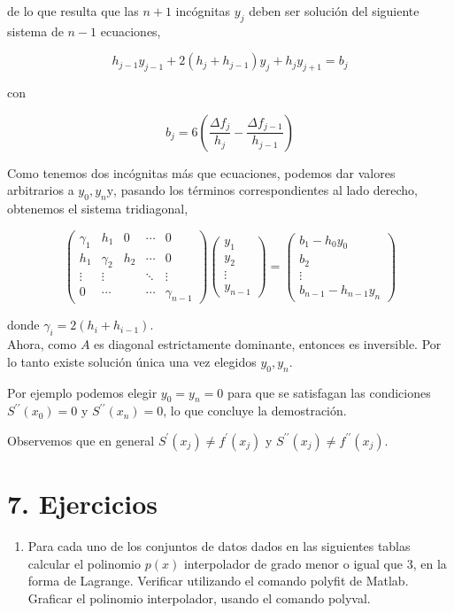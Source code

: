 \documentclass[10pt]{article}
\begin{document}
de lo que resulta que las $n+1$ incógnitas $y_{j}$ deben ser solución del siguiente sistema de $n-1$ ecuaciones,

$$
h_{j-1} y_{j-1}+2\left(h_{j}+h_{j-1}\right) y_{j}+h_{j} y_{j+1}=b_{j}
$$

con

$$
b_{j}=6\left(\frac{\Delta f_{j}}{h_{j}}-\frac{\Delta f_{j-1}}{h_{j-1}}\right)
$$

Como tenemos dos incógnitas más que ecuaciones, podemos dar valores arbitrarios a $y_{0}, y_{n} \mathrm{y}$, pasando los términos correspondientes al lado derecho, obtenemos el sistema tridiagonal,

$$
\left(\begin{array}{ccccc}
\gamma_{1} & h_{1} & 0 & \cdots & 0 \\
h_{1} & \gamma_{2} & h_{2} & \cdots & 0 \\
\vdots & \vdots & & \ddots & \vdots \\
0 & \cdots & & \cdots & \gamma_{n-1}
\end{array}\right)\left(\begin{array}{c}
y_{1} \\
y_{2} \\
\vdots \\
y_{n-1}
\end{array}\right)=\left(\begin{array}{c}
b_{1}-h_{0} y_{0} \\
b_{2} \\
\vdots \\
b_{n-1}-h_{n-1} y_{n}
\end{array}\right)
$$

donde $\gamma_{i}=2\left(h_{i}+h_{i-1}\right)$.\\
Ahora, como $A$ es diagonal estrictamente dominante, entonces es inversible. Por lo tanto existe solución única una vez elegidos $y_{0}, y_{n}$.

Por ejemplo podemos elegir $y_{0}=y_{n}=0$ para que se satisfagan las condiciones $S^{\prime \prime}\left(x_{0}\right)=0$ y $S^{\prime \prime}\left(x_{n}\right)=0$, lo que concluye la demostración.

Observemos que en general $S^{\prime}\left(x_{j}\right) \neq f^{\prime}\left(x_{j}\right)$ y $S^{\prime \prime}\left(x_{j}\right) \neq f^{\prime \prime}\left(x_{j}\right)$.

\section*{7. Ejercicios}
\begin{enumerate}
  \item Para cada uno de los conjuntos de datos dados en las siguientes tablas calcular el polinomio $p(x)$ interpolador de grado menor o igual que 3, en la forma de Lagrange. Verificar utilizando el comando polyfit de Matlab. Graficar el polinomio interpolador, usando el comando polyval.
\end{enumerate}
\end{document}

